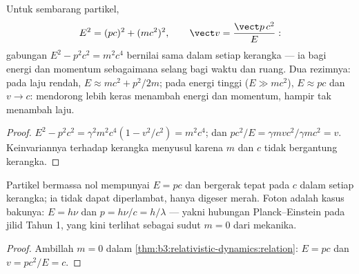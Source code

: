 \begin{theorem}\label{thm:b3:relativistic-dynamics:relation}
Untuk sembarang partikel,
\[
E^2 = (pc)^2 + (mc^2)^2 ,
\qquad
\vect v = \frac{\vect p\,c^2}{E} :
\]
gabungan $E^2 - p^2c^2 = m^2c^4$ bernilai sama dalam setiap kerangka
--- ia bagi energi dan momentum sebagaimana selang bagi waktu dan
ruang. Dua rezimnya: pada laju rendah, $E \approx mc^2 + p^2/2m$; pada
energi tinggi ($E \gg mc^2$), $E \approx pc$ dan $v \to c$: mendorong
lebih keras menambah energi dan momentum, hampir tak menambah laju.
\end{theorem}

\begin{proof}
$E^2 - p^2c^2 = \gamma^2m^2c^4(1 - v^2/c^2) = m^2c^4$; dan $pc^2/E =
\gamma mvc^2/\gamma mc^2 = v$. Keinvariannya terhadap kerangka menyusul
karena $m$ dan $c$ tidak bergantung kerangka.
\end{proof}

\begin{proposition}\label{prop:b3:relativistic-dynamics:massless}
Partikel bermassa nol mempunyai $E = pc$ dan bergerak tepat pada $c$
dalam setiap kerangka; ia tidak dapat diperlambat, hanya digeser merah.
Foton adalah kasus bakunya: $E = h\nu$ dan $p = h\nu/c = h/\lambda$ ---
yakni hubungan Planck--Einstein pada jilid Tahun 1, yang kini terlihat
sebagai sudut $m = 0$ dari mekanika.
\end{proposition}

\begin{proof}
Ambillah $m = 0$ dalam \cref{thm:b3:relativistic-dynamics:relation}: $E = pc$
dan $v = pc^2/E = c$.
\end{proof}

